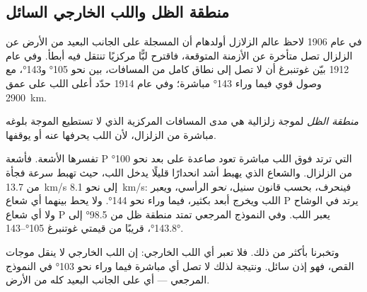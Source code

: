 \subsection{منطقة الظل واللب الخارجي السائل}

في عام 1906 لاحظ عالم الزلازل أولدهام أن  المسجلة على الجانب البعيد
من الأرض عن الزلزال تصل متأخرة عن الأزمنة
المتوقعة، فاقترح لبًّا مركزيًا تنتقل فيه أبطأ. وفي
عام 1912 بيّن غوتنبرغ أن  لا تصل إلى نطاق كامل من المسافات،
بين نحو \ang{105} و\ang{143}، مع وصول قوي فيما وراء
\ang{143} مباشرة؛ وفي عام 1914 حدّد أعلى اللب على عمق \qty{2900}{km}.

\begin{definition}\label{def:g11:seismic-structure:shadow-zone}
\emph{منطقة الظل} لموجة زلزالية هي مدى
المسافات المركزية الذي لا تستطيع الموجة بلوغه مباشرة من
الزلزال، لأن اللب يحرفها عنه أو يوقفها.
\end{definition}

تفسرها الأشعة. فأشعة P التي ترتد فوق اللب مباشرة تعود صاعدة
على بعد نحو \ang{100} من الزلزال. والشعاع الذي يهبط أشد انحدارًا قليلًا
يدخل اللب، حيث تهبط سرعة  فجأة من \qty{13.7}{km/s} إلى
نحو \qty{8.1}{km/s}: فينحرف، بحسب قانون سنيل، \emph{نحو} الرأسي،
ويعبر اللب ويخرج أبعد بكثير، فيما وراء نحو \ang{144}. ولا يحط بينهما أي
شعاع P يرتد في الوشاح ولا أي شعاع P يعبر اللب.
وفي النموذج المرجعي تمتد منطقة ظل  من \ang{98.5} إلى
\ang{143.8}، قريبًا من قيمتي غوتنبرغ \ang{105}--\ang{143}.

وتخبرنا  بأكثر من ذلك. فلا تعبر أي  اللب الخارجي: إن اللب الخارجي لا
ينقل موجات القص، فهو إذن سائل. ونتيجة لذلك لا تصل أي  مباشرة
فيما وراء نحو \ang{103} في النموذج المرجعي --- أي على الجانب البعيد كله من
الأرض.

